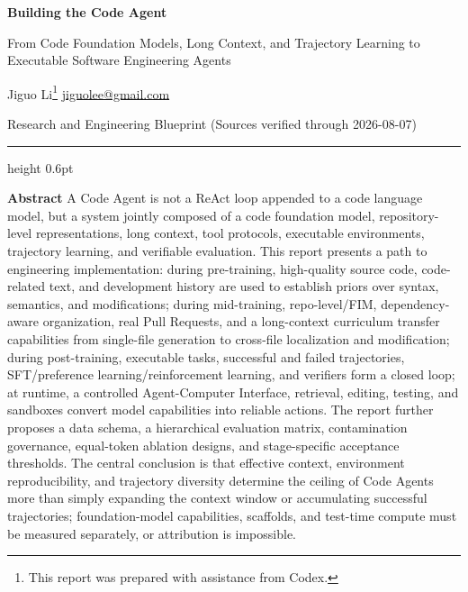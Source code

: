 \documentclass[10pt,a4paper,UTF8,fontset=none]{ctexart}
\begin{document}
\renewcommand{\contentsname}{Contents}
\renewcommand{\figurename}{Figure}
\renewcommand{\tablename}{Table}
\renewcommand{\refname}{References}
\renewcommand{\appendixname}{Appendix}
\markboth{}{}

\begin{center}
  {\bfseries\color{Navy} Building the Code Agent\par}
  \vspace{4pt}
  {\color{Navy} From Code Foundation Models, Long Context, and Trajectory Learning to Executable Software Engineering Agents\par}
  \vspace{6pt}
  {\small Jiguo Li\footnote{{This report was prepared with assistance from Codex.}}\quad
  \href{mailto:jiguolee@gmail.com}{jiguolee@gmail.com}\par}
  \vspace{4pt}
  {\small Research and Engineering Blueprint (Sources verified through 2026-08-07)\par}
\end{center}

\vspace{6pt}
{\color{Navy}\hrule height 0.6pt}
\vspace{8pt}

\noindent\textbf{Abstract}\quad
A Code Agent is not a ReAct loop appended to a code language model, but a system jointly composed of a code foundation model, repository-level representations, long context, tool protocols, executable environments, trajectory learning, and verifiable evaluation. This report presents a path to engineering implementation: during pre-training, high-quality source code, code-related text, and development history are used to establish priors over syntax, semantics, and modifications; during mid-training, repo-level/FIM, dependency-aware organization, real Pull Requests, and a long-context curriculum transfer capabilities from single-file generation to cross-file localization and modification; during post-training, executable tasks, successful and failed trajectories, SFT/preference learning/reinforcement learning, and verifiers form a closed loop; at runtime, a controlled Agent-Computer Interface, retrieval, editing, testing, and sandboxes convert model capabilities into reliable actions. The report further proposes a data schema, a hierarchical evaluation matrix, contamination governance, equal-token ablation designs, and stage-specific acceptance thresholds. The central conclusion is that effective context, environment reproducibility, and trajectory diversity determine the ceiling of Code Agents more than simply expanding the context window or accumulating successful trajectories; foundation-model capabilities, scaffolds, and test-time compute must be measured separately, or attribution is impossible.
\end{document}
